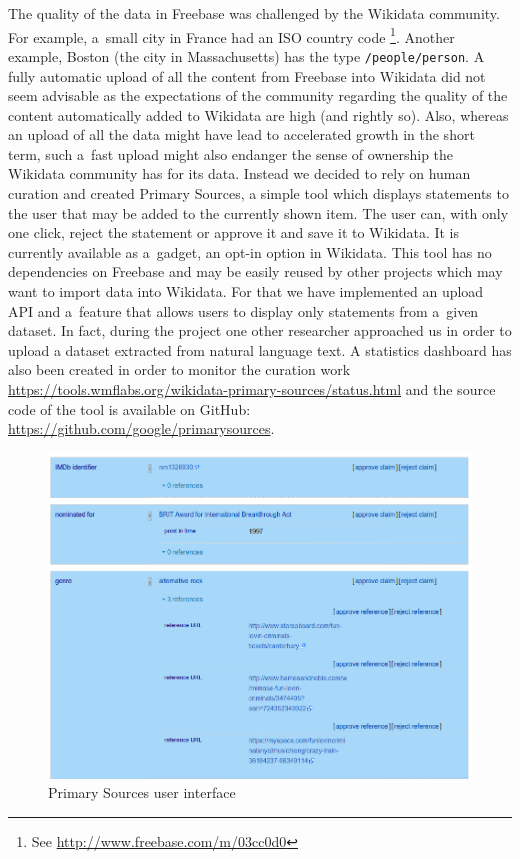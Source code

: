 \documentclass{sig-alternate}
\begin{document}
The quality of the data in Freebase was challenged by the Wikidata community.
For example, a~small city in France had an ISO country code%
\footnote{See \url{http://www.freebase.com/m/03cc0d0}}.
Another example, Boston (the city in Massachusetts) has the type \texttt{/people/person}.
A fully automatic upload of all the content from Freebase into Wikidata
did not seem advisable as the expectations of the community regarding
the quality of the content automatically added to Wikidata are high (and rightly so).
Also, whereas an upload of all the data might have lead to accelerated growth
in the short term, such a~fast upload might also endanger the sense of ownership
the Wikidata community has for its data.
Instead we decided to rely on human curation and created Primary Sources,
a simple tool which displays statements to the user that may be added to the currently shown item.
The user can, with only one click, reject the statement or approve it and save it to Wikidata.
It is currently available as a~gadget, an opt-in option in Wikidata.
This tool has no dependencies on Freebase and may be easily reused by other projects
which may want to import data into Wikidata.
For that we have implemented an upload API and a~feature that allows users
to display only statements from a~given dataset.
In fact, during the project one other researcher approached us in order to upload
a dataset extracted from natural language text.
A statistics dashboard has also been created in order to monitor the curation work
\url{https://tools.wmflabs.org/wikidata-primary-sources/status.html}
and the source code of the tool is available on GitHub:
\url{https://github.com/google/primarysources}.

\begin{figure}[!htbp]
\centering
\includegraphics[width=8.45 cm]{img/primary-sources.png}
\caption{Primary Sources user interface}
\end{figure}
\end{document}
